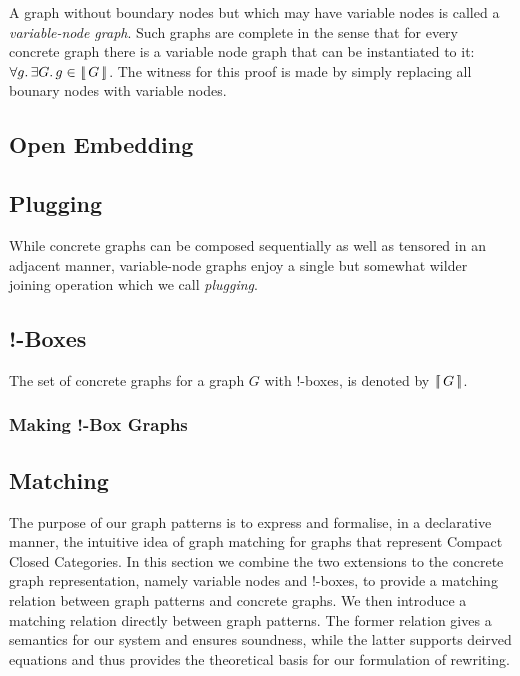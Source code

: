 \documentclass[runningheads]{llncs}
\newcommand{\vinterp}[1]{\lfloor\hspace{-0.27em}|\, #1\, |\hspace{-0.27em}\rfloor}
\newcommand{\binterp}[1]{\lceil\hspace{-0.27em}|\, #1\, |\hspace{-0.27em}\rceil}
\begin{document}
A graph without boundary nodes but which may have variable nodes is
called a \emph{variable-node graph}. Such graphs are complete in the
sense that for every concrete graph there is a variable node graph
that can be instantiated to it: $\forall g.\,\exists G.\,g \in
\vinterp{G}$. The witness for this proof is made by simply replacing
all bounary nodes with variable nodes.


\subsection{Open Embedding}



\subsection{Plugging}

While concrete graphs can be composed sequentially as well as tensored
in an adjacent manner, variable-node graphs enjoy a single but
somewhat wilder joining operation which we call \emph{plugging}. 

\subsection{!-Boxes}

The set of concrete graphs for a graph $G$ with !-boxes, is denoted by
$\binterp{G}$.

\subsubsection{Making !-Box Graphs}

\subsection{Matching}

The purpose of our graph patterns is to express and formalise, in a
declarative manner, the intuitive idea of graph matching for graphs
that represent Compact Closed Categories. In this section we combine
the two extensions to the concrete graph representation, namely
variable nodes and !-boxes, to provide a matching relation between
graph patterns and concrete graphs. We then introduce a matching
relation directly between graph patterns. The former relation gives a
semantics for our system and ensures soundness, while the latter
supports deirved equations and thus provides the theoretical basis for
our formulation of rewriting.
\end{document}
